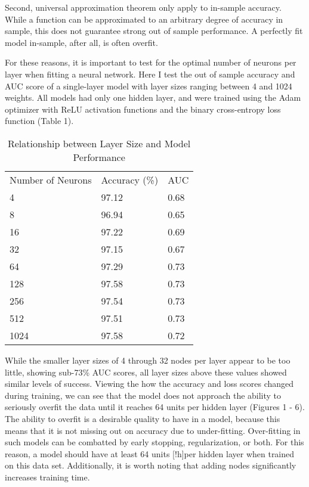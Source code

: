 \documentclass[12pt]{article}  %
\theoremstyle{definition}
\theoremstyle{remark}
\begin{document}
\par Second, universal approximation theorem only apply to in-sample accuracy. While a function can be approximated to an arbitrary degree of accuracy in sample, this does not guarantee strong out of sample performance. A perfectly fit model in-sample, after all, is often overfit. 

\par For these reasons, it is important to test for the optimal number of neurons per layer when fitting a neural network. Here I test the out of sample accuracy and AUC score of a single-layer model with layer sizes ranging between 4 and 1024 weights. All models had only one hidden layer, and were trained using the Adam optimizer with ReLU activation functions and the binary cross-entropy loss function (Table 1). 

\begin{table}[!h]
\centering
\caption{Relationship between Layer Size and Model Performance}
\label{my-label}
\begin{tabular}{lll}
Number of Neurons & Accuracy (\%) & AUC  \\
4                 & 97.12         & 0.68 \\
8                 & 96.94         & 0.65 \\
16                & 97.22         & 0.69 \\
32                & 97.15         & 0.67 \\
64                & 97.29         & 0.73 \\
128               & 97.58         & 0.73 \\
256               & 97.54         & 0.73 \\
512               & 97.51         & 0.73 \\
1024              & 97.58         & 0.72
\end{tabular}
\end{table}


\par While the smaller layer sizes of 4 through 32 nodes per layer appear to be too little, showing sub-73\% AUC scores, all layer sizes above these values showed similar levels of success. Viewing the how the accuracy and loss scores changed during training, we can see that the model does not approach the ability to seriously overfit the data until it reaches 64 units per hidden layer (Figures 1 - 6). The ability to overfit is a desirable quality to have in a model, because this means that it is not missing out on accuracy due to under-fitting. Over-fitting in such models can be combatted by early stopping, regularization, or both. For this reason, a model should have at least 64 units [!h]per hidden layer when trained on this data set. Additionally, it is worth noting that adding nodes significantly increases training time.
\end{document}
